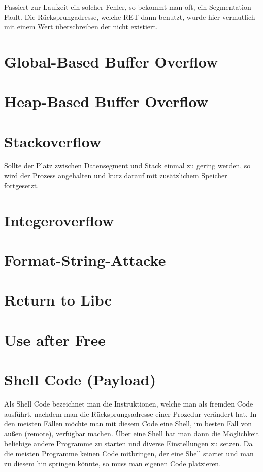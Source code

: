 \documentclass[12pt]{book}
\begin{document}
Passiert zur Laufzeit ein solcher Fehler, so bekommt man oft, ein Segmentation
Fault. Die Rücksprungadresse, welche RET dann benutzt, wurde hier vermutlich mit
einem Wert überschreiben der nicht existiert.

\section{Global-Based Buffer Overflow}

\section{Heap-Based Buffer Overflow}

\section{Stackoverflow}
Sollte der Platz zwischen Datensegment und Stack einmal zu gering werden, so
wird der Prozess angehalten und kurz darauf mit zusätzlichem Speicher
fortgesetzt.

\section{Integeroverflow}

\section{Format-String-Attacke}

\section{Return to Libc}

\section{Use after Free}

\section{Shell Code (Payload)}

Als Shell Code bezeichnet man die Instruktionen, welche man als fremden Code
ausführt, nachdem man die Rücksprungsadresse einer Prozedur verändert hat. In
den meisten Fällen möchte man mit diesem Code eine Shell, im besten Fall von
außen (remote), verfügbar machen. Über eine Shell hat man dann die Möglichkeit
beliebige andere Programme zu starten und diverse Einstellungen zu setzen. Da
die meisten Programme keinen Code mitbringen, der eine Shell startet und man zu
diesem hin springen könnte, so muss man eigenen Code platzieren.
\end{document}
